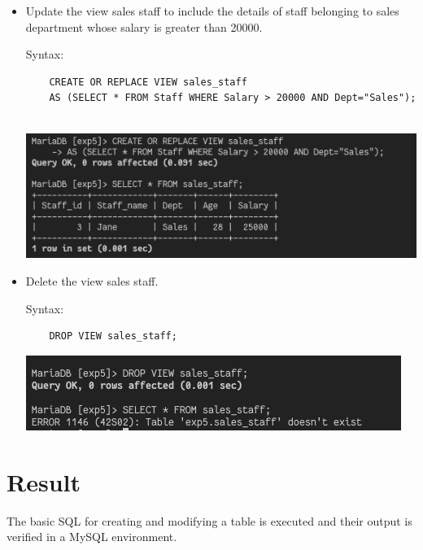 \documentclass[13pt,oneside]{book}
\begin{document}
\begin{itemize}
\begin{verbatim}
	\end{verbatim}
	
	
	\item
	Update the view sales staff to include the details of staff belonging to sales department whose salary is greater than 20000. 
	 
	Syntax:
	\begin{verbatim}
	CREATE OR REPLACE VIEW sales_staff 
	AS (SELECT * FROM Staff WHERE Salary > 20000 AND Dept="Sales");
	
	\end{verbatim}
	\includegraphics[]{img/p5/ss4.png}
	
	
	\item
	Delete the view sales staff.
	
	Syntax:
	\begin{verbatim}
	DROP VIEW sales_staff;
	\end{verbatim}
	\includegraphics[]{img/p5/ss5.png}
\end{itemize}
\section*{Result}
	The basic SQL for creating and modifying a table is executed and their output
	is verified in a MySQL environment.
\end{document}
